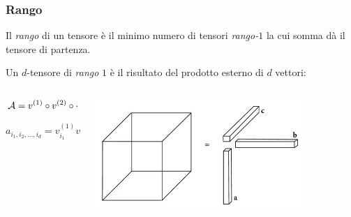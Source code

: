 \documentclass[compress]{beamer}
\theoremstyle{definition}
\theoremstyle{plain}
\begin{document}
\begin{frame}
\frametitle{Rango}
Il \emph{rango} di un tensore è il minimo numero di tensori \emph{rango-$1$} la cui somma dà il tensore di partenza.

\pause
\vspace{5mm}
Un $d$-tensore di \emph{rango} $1$ è il risultato del prodotto esterno di $d$ vettori:

\begin{columns}
\begin{column}{0.5\textwidth}
\begin{equation*}
  \mathcal{A} = v^{(1)} \circ v^{(2)} \circ \cdots \circ v^{(d)}
\end{equation*}

\begin{equation*}
  a_{i_1,i_2,\ldots,i_d} = v_{i_1}^{(1)} v_{i_2}^{(2)} \cdots v_{i_d}^{(d)}
\end{equation*}
\end{column}

\begin{column}{0.5\textwidth}
\begin{center}
	\includegraphics[width=0.8\textwidth]{Img/rank_one_tensor.jpg}
\end{center}
\end{column}
\end{columns}
\end{frame}

\end{document}
